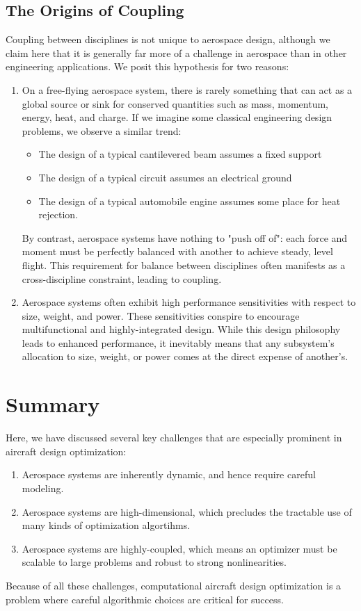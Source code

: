 \subsection{The Origins of Coupling}

Coupling between disciplines is not unique to aerospace design, although we claim here that it is generally far more of a challenge in aerospace than in other engineering applications. We posit this hypothesis for two reasons:

\begin{enumerate}
    \item On a free-flying aerospace system, there is rarely something that can act as a global source or sink for conserved quantities such as mass, momentum, energy, heat, and charge. If we imagine some classical engineering design problems, we observe a similar trend:
    \begin{itemize}
        \item The design of a typical cantilevered beam assumes a fixed support
        \item The design of a typical circuit assumes an electrical ground
        \item The design of a typical automobile engine assumes some place for heat rejection.
    \end{itemize}
    By contrast, aerospace systems have nothing to "push off of": each force and moment must be perfectly balanced with another to achieve steady, level flight. This requirement for balance between disciplines often manifests as a cross-discipline constraint, leading to coupling.
    \item Aerospace systems often exhibit high performance sensitivities with respect to size, weight, and power. These sensitivities conspire to encourage multifunctional and highly-integrated design. While this design philosophy leads to enhanced performance, it inevitably means that any subsystem's allocation to size, weight, or power comes at the direct expense of another's.
\end{enumerate}

\section{Summary}

Here, we have discussed several key challenges that are especially prominent in aircraft design optimization:

\begin{enumerate}
    \item Aerospace systems are inherently dynamic, and hence require careful modeling.
    \item Aerospace systems are high-dimensional, which precludes the tractable use of many kinds of optimization algortihms.
    \item Aerospace systems are highly-coupled, which means an optimizer must be scalable to large problems and robust to strong nonlinearities.
\end{enumerate}

Because of all these challenges, computational aircraft design optimization is a problem where careful algorithmic choices are critical for success.